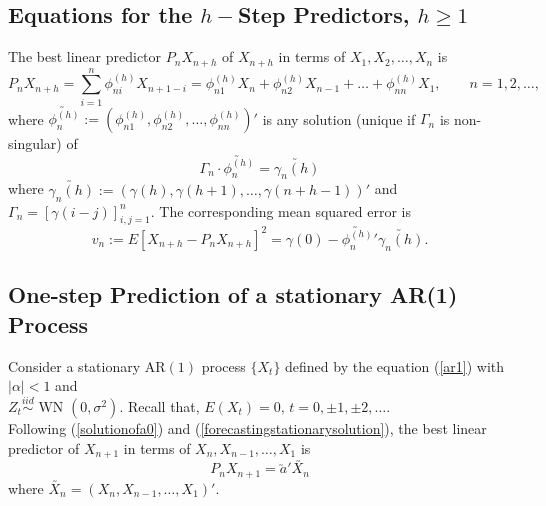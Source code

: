\documentclass[11pt, a4paper]{article}
\numberwithin{equation}{section}
\theoremstyle{definition}
\begin{document}
\subsection{Equations for the $h-$Step Predictors, $h \geq 1$}

The best linear predictor $P_nX_{n+h}$ of $X_{n+h}$ in terms of $X_1, X_2, \ldots, X_n$ is
\begin{equation}\label{hsteppredictionequation}
P_nX_{n+h} = \sum \limits_{i = 1}^{n} \phi_{ni}^{(h)} X_{n+1-i} = \phi_{n1}^{(h)} X_{n} + \phi_{n2}^{(h)} X_{n-1} + \ldots + \phi_{nn}^{(h)} X_{1}, \qquad n = 1, 2, \ldots,
\end{equation}
where $\utilde{\phi_n^{(h)}} := \left( \phi_{n1}^{(h)}, \phi_{n2}^{(h)}, \ldots, \phi_{nn}^{(h)} \right)'$ is any solution (unique if $\Gamma_n$ is non-singular) of 
\begin{equation}\label{hsteppredictionmatrixequation}
\Gamma_n \cdot \utilde{\phi_n^{(h)}} = \utilde{\gamma_n (h)}
\end{equation} 
where $\utilde{\gamma_n (h)} := \left(\gamma(h), \gamma(h+1), \ldots, \gamma(n+h-1) \right)'$ and $\Gamma_n = \left[ \gamma(i-j) \right]_{i, j = 1}^{n}$. The corresponding mean squared error is 
\begin{equation}\label{hsteppredictionequationMSE}
v_n := E\left[ X_{n+h} - P_n X_{n+h} \right]^2 = \gamma(0) - \utilde{\phi_n^{(h)}}' \utilde{\gamma_n (h)}.
\end{equation}

\subsection{One-step Prediction of a stationary AR(1) Process}

Consider a stationary AR$(1)$ process $\{X_t\}$ defined by the equation (\ref{ar1}) with $|\alpha| < 1$ and \\ $Z_t \overset{iid}{\sim} \text{ WN }(0, \sigma^2)$. Recall that, $E(X_t) = 0, \, t = 0, \pm 1, \pm 2, \ldots$. \\[0.1em]

Following (\ref{solutionofa0}) and (\ref{forecastingstationarysolution}), the best linear predictor of $X_{n+1}$ in terms of $X_n, X_{n-1}, \ldots, X_1$ is
$$P_n X_{n+1} = \utilde{a}'\utilde{X_n}$$
where $\utilde{X_n} = (X_n, X_{n-1}, \ldots, X_1)'$. \\[0.1em]
\end{document}
